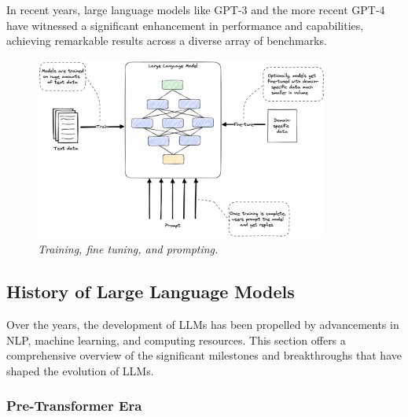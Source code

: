 In recent years, large language models like GPT-3 and the more recent GPT-4 have witnessed a significant enhancement in performance and capabilities, achieving remarkable results across a diverse array of benchmarks.

\begin{figure}[H]
    \centering
    \includegraphics[width=\textwidth,height=6cm,keepaspectratio=true]{llms.png}
    \caption{
        \it{Training, fine tuning, and prompting.}
    }
\end{figure}

\subsection{History of Large Language Models}

Over the years, the development of LLMs has been propelled by advancements in NLP, machine learning, and computing resources. This section offers a comprehensive overview of the significant milestones and breakthroughs that have shaped the evolution of LLMs.

\subsubsection*{Pre-Transformer Era}

